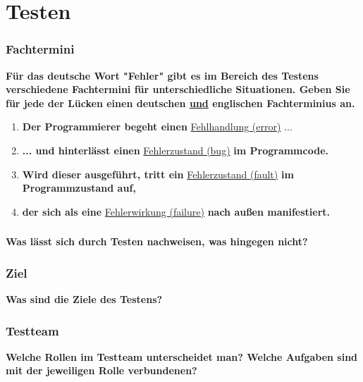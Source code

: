 \part{Testen}
\section{Fachtermini}
\textbf{Für das deutsche Wort "Fehler" gibt es im Bereich des Testens verschiedene Fachtermini für unterschiedliche Situationen. Geben Sie für jede der Lücken einen deutschen \underline{und} englischen Fachterminius an.}
\begin{enumerate}
    \item \textbf{Der Programmierer begeht einen} \underline{Fehlhandlung (error)} ...
    \item \textbf{... und hinterlässt einen} \underline{Fehlerzustand (bug)} \textbf{im Programmcode.}
    \item \textbf{Wird dieser ausgeführt, tritt ein} \underline{Fehlerzustand (fault)} \textbf{im Programmzustand auf,}
    \item \textbf{der sich als eine} \underline{Fehlerwirkung (failure)} \textbf{nach au\ss en manifestiert.}
\end{enumerate}

\section{}
\textbf{Was lässt sich durch Testen nachweisen, was hingegen nicht?}

\section{Ziel}
\textbf{Was sind die Ziele des Testens?}

\section{Testteam}
\textbf{Welche Rollen im Testteam unterscheidet man? Welche Aufgaben sind mit der jeweiligen Rolle verbundenen?}

